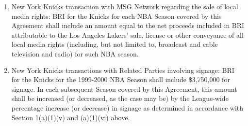 \documentclass[
]{book}
\providecommand{\tightlist}{%
  \setlength{\itemsep}{0pt}\setlength{\parskip}{0pt}}
\begin{document}
\begin{enumerate}
\begin{enumerate}
\begin{enumerate}
      \begin{enumerate}
      \def\labelenumiv{(\Alph{enumiv})}
      \tightlist
      \item
        New York Knicks transaction with MSG Network regarding the sale of local media rights: BRI for the Knicks for each NBA Season covered by this Agreement shall include an amount equal to the net proceeds included in BRI attributable to the Los Angeles Lakers' sale, license or other conveyance of all local media rights (including, but not limited to, broadcast and cable television and radio) for such NBA season.
      \item
        New York Knicks transactions with Related Parties involving signage: BRI for the Knicks for the 1999-2000 NBA Season shall include \$3,750,000 for signage. In each subsequent Season covered by this Agreement, this amount shall be increased (or decreased, as the case may be) by the League-wide percentage increase (or decrease) in signage as determined in accordance with Section 1(a)(1)(v) and (a)(1)(vi) above.
      \end{enumerate}


\end{enumerate}
\end{enumerate}
\end{enumerate}
\end{document}
